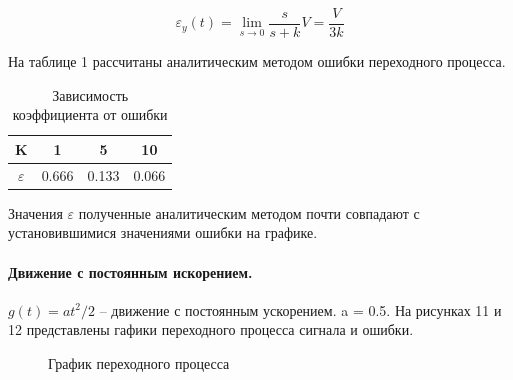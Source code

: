 \documentclass[a4paper, 11pt]{article}
\begin{document}
\begin{equation}
	\varepsilon_y(t)=\lim_{s\to0}\frac{s}{s+k}V=\frac{V}{3k}
\end{equation}

На таблице 1 рассчитаны аналитическим методом ошибки переходного процесса.

\begin{table}[h]
    \begin{center}
   	\caption{Зависимость коэффициента от ошибки}
    \begin{tabular}{|c|c|c|c|}
    \hline
         K & 1 & 5 & 10 \\
         \hline
         $\varepsilon$ & 0.666 & 0.133 & 0.066 \\
    \hline     
    \end{tabular}    
    \label{tab:two}
    \end{center}
\end{table}

Значения $\varepsilon$ полученные аналитическим методом почти совпадают с установившимися значениями ошибки на графике.\\


\paragraph{Движение с постоянным искорением.} $g(t)=at^2/2$ – движение с постоянным ускорением. a = 0.5. На рисунках 11 и 12 представлены гафики переходного процесса сигнала и ошибки.

\begin{figure}[h!]
    \caption{График переходного процесса}
    \label{two}
\end{figure}

\newpage
\end{document}
